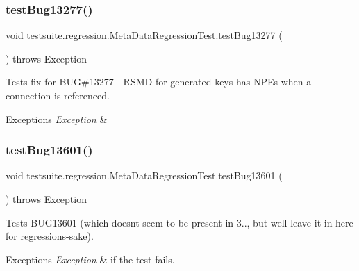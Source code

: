 \subsubsection{\texorpdfstring{test\+Bug13277()}{testBug13277()}}
{\footnotesize\ttfamily void testsuite.\+regression.\+Meta\+Data\+Regression\+Test.\+test\+Bug13277 (\begin{DoxyParamCaption}{ }\end{DoxyParamCaption}) throws Exception}

Tests fix for B\+UG\#13277 -\/ R\+S\+MD for generated keys has N\+P\+Es when a connection is referenced.


\begin{DoxyExceptions}{Exceptions}
{\em Exception} & \\
\hline
\end{DoxyExceptions}
\mbox{\label{classtestsuite_1_1regression_1_1_meta_data_regression_test_a9f064453a9a5087f0e60300320e2f041}} 
\subsubsection{\texorpdfstring{test\+Bug13601()}{testBug13601()}}
{\footnotesize\ttfamily void testsuite.\+regression.\+Meta\+Data\+Regression\+Test.\+test\+Bug13601 (\begin{DoxyParamCaption}{ }\end{DoxyParamCaption}) throws Exception}

Tests B\+U\+G13601 (which doesn\textquotesingle{}t seem to be present in 3.., but we\textquotesingle{}ll leave it in here for regression\textquotesingle{}s-\/sake).


\begin{DoxyExceptions}{Exceptions}
{\em Exception} & if the test fails. \\
\hline
\end{DoxyExceptions}
\mbox{\label{classtestsuite_1_1regression_1_1_meta_data_regression_test_a0b21041ed61d6a8c105f6d7ee954efbd}} 
